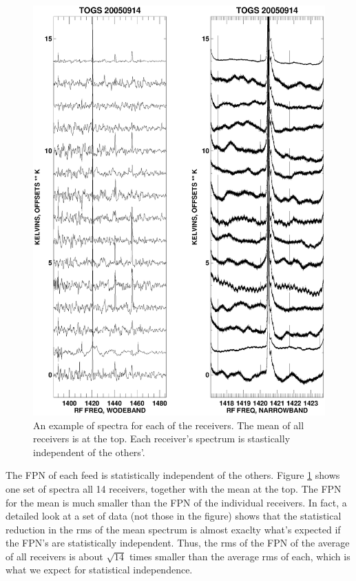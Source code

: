 \documentclass[psfig,preprint]{aastex}
\begin{document}
\begin{figure}[!p]
\begin{center}
\includegraphics[width=6in]{quickfig.ps}   
\end{center}
\caption{An example of spectra for each of the receivers. The mean of all
receivers is at the top. Each receiver's spectrum is stastically
independent of the others'. \label{quickfig}}
\end{figure}

	The FPN of each feed is statistically independent of the others. 
Figure \ref{quickfig} shows one set of spectra all 14 receivers,
together with the mean at the top.  The FPN for the mean is much smaller
than the FPN of the individual receivers.  In fact, a detailed look at a
set of data (not those in the figure) shows that the statistical
reduction in the rms of the mean spectrum is almost exaclty what's
expected if the FPN's are statistically independent.  Thus, the rms of
the FPN of the average of all receivers is about $\sqrt{14}$ times smaller
than the average rms of each, which is what we expect for statistical
independence. 
\end{document}

